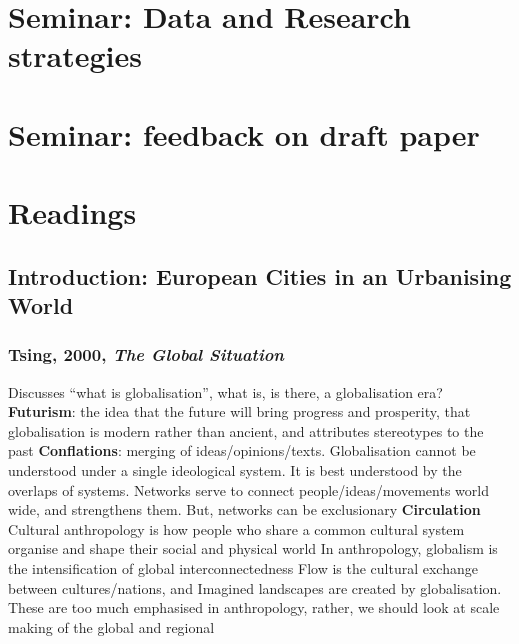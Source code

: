 \documentclass{article}
\begin{document}
\section{Seminar: Data and Research strategies}
\date{October 26th, 2021}




\section{Seminar: feedback on draft paper}
\date{December 13th, 2021}


\section{Readings}

\subsection{Introduction: European Cities in an Urbanising World}

\subsubsection{Tsing, 2000, \textit{The Global Situation}}

\begin{outline}
	\1 Discusses ``what is globalisation'', what is, is there, a globalisation era?
	\1 \textbf{Futurism}: the idea that the future will bring progress and prosperity, that globalisation is modern rather than ancient, and attributes stereotypes to the past
	\1 \textbf{Conflations}: merging of ideas/opinions/texts. Globalisation cannot be understood under a single ideological system. It is best understood by the overlaps of systems. Networks serve to connect people/ideas/movements world wide, and strengthens them. But, networks can be exclusionary
	\1 \textbf{Circulation}
	\1 Cultural anthropology is how people who share a common cultural system organise and shape their social and physical world
	\1 In anthropology, globalism is the intensification of global interconnectedness
	\1 Flow is the cultural exchange between cultures/nations, and Imagined landscapes are created by globalisation. These are too much emphasised in anthropology, rather, we should look at scale making of the global and regional
\end{outline}
\end{document}

